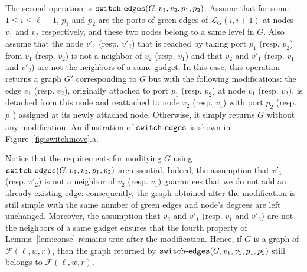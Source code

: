 \documentclass[11pt]{article}
\begin{document}
The second operation is ${\tt switch\mbox{-}edges}(G,v_1,v_2,p_1,p_2)$. Assume that for some $1\leq i\leq \ell-1$, $p_1$ and $p_2$ are the ports of green edges of $\mathcal{L}_G(i,i+1)$ at nodes $v_1$ and $v_2$ respectively, and these two nodes belong to a same level in $G$. Also assume that the node $v'_1$ (resp. $v'_2$) that is reached by taking port $p_1$ (resp. $p_2$) from $v_1$ (resp. $v_2$) is not a neighbor of $v_2$ (resp. $v_1$) and that $v_2$ and $v'_1$ (resp. $v_1$ and $v'_2$) are not the neighbors of a same gadget. In this case, this operation returns a graph $G'$ corresponding to $G$ but with the following modifications: the edge $e_1$ (resp. $e_2$), originally attached to port $p_1$ (resp. $p_2$) at node $v_1$ (resp. $v_2$), is detached from this node and reattached to node $v_2$ (resp. $v_1$) with port $p_2$ (resp. $p_1$) assigned at its newly attached node. Otherwise, it simply returns $G$ without any modification. An illustration of ${\tt switch\mbox{-}edges}$ is shown in Figure~\ref{fig:switchmove}.a.

Notice that the requirements for modifying $G$ using ${\tt switch\mbox{-}edges}(G,v_1,v_2,p_1,p_2)$ are essential. Indeed, the assumption that $v'_1$ (resp. $v'_2$) is not a neighbor of $v_2$ (resp. $v_1$) guarantees that we do not add an already existing edge: consequently, the graph obtained after the modification  is still simple with the same number of green edges and node's degrees are left unchanged. Moreover, the assumption that   $v_2$ and $v'_1$ (resp. $v_1$ and $v'_2$) are not the neighbors of a same gadget ensures that the fourth property of Lemma~\ref{lem:conse} remains true after the modification. Hence, if $G$ is a graph of $\mathcal{F}(\ell,w,r)$, then the graph returned by ${\tt switch\mbox{-}edges}(G,v_1,v_2,p_1,p_2)$ still belongs to $\mathcal{F}(\ell,w,r)$.
\end{document}
